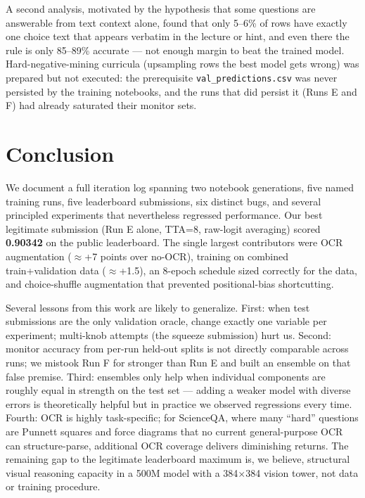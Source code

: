 \documentclass[11pt]{article}
\begin{document}
A second analysis, motivated by the hypothesis that some questions are answerable from text context alone, found that only 5--6\% of rows have exactly one choice text that appears verbatim in the lecture or hint, and even there the rule is only 85--89\% accurate --- not enough margin to beat the trained model. Hard-negative-mining curricula (upsampling rows the best model gets wrong) was prepared but not executed: the prerequisite \texttt{val\_predictions.csv} was never persisted by the training notebooks, and the runs that did persist it (Runs E and F) had already saturated their monitor sets.

\section{Conclusion}

We document a full iteration log spanning two notebook generations, five named training runs, five leaderboard submissions, six distinct bugs, and several principled experiments that nevertheless regressed performance. Our best legitimate submission (Run E alone, TTA=8, raw-logit averaging) scored \textbf{0.90342} on the public leaderboard. The single largest contributors were OCR augmentation ($\approx$+7 points over no-OCR), training on combined train+validation data ($\approx$+1.5), an 8-epoch schedule sized correctly for the data, and choice-shuffle augmentation that prevented positional-bias shortcutting.

Several lessons from this work are likely to generalize. First: when test submissions are the only validation oracle, change exactly one variable per experiment; multi-knob attempts (the squeeze submission) hurt us. Second: monitor accuracy from per-run held-out splits is not directly comparable across runs; we mistook Run F for stronger than Run E and built an ensemble on that false premise. Third: ensembles only help when individual components are roughly equal in strength on the test set --- adding a weaker model with diverse errors is theoretically helpful but in practice we observed regressions every time. Fourth: OCR is highly task-specific; for ScienceQA, where many ``hard'' questions are Punnett squares and force diagrams that no current general-purpose OCR can structure-parse, additional OCR coverage delivers diminishing returns. The remaining gap to the legitimate leaderboard maximum is, we believe, structural visual reasoning capacity in a 500M model with a 384$\times$384 vision tower, not data or training procedure.
\end{document}
